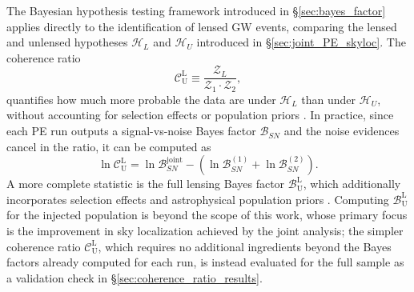 The Bayesian hypothesis testing framework introduced in 
\S\ref{sec:bayes_factor} applies directly to the 
identification of lensed GW events, comparing the lensed and unlensed hypotheses $\mathcal{H}_L$ and $\mathcal{H}_U$ introduced in \S\ref{sec:joint_PE_skyloc}. The coherence ratio
\begin{equation}
    \mathcal{C}_\mathrm{U}^\mathrm{L} \equiv 
    \frac{\mathcal{Z}_L}{\mathcal{Z}_1 \cdot \mathcal{Z}_2},
    \label{eq:coherence_ratio}
\end{equation}
quantifies how much more probable the data are under 
$\mathcal{H}_L$ than under $\mathcal{H}_U$, without 
accounting for selection effects or population priors 
\cite{lensing_regimes}. In practice, since each PE run outputs a signal-vs-noise Bayes factor $\mathcal{B}_{SN}$ and the noise evidences cancel in the ratio, it can be 
computed as
\begin{equation}
    \ln \mathcal{C}_\mathrm{U}^\mathrm{L} = 
    \ln \mathcal{B}_{SN}^\mathrm{joint} - 
    \left(\ln \mathcal{B}_{SN}^{(1)} + 
    \ln \mathcal{B}_{SN}^{(2)}\right).
    \label{eq:coherence_ratio_practical}
\end{equation}
A more complete statistic is the full lensing Bayes
factor $\mathcal{B}_\mathrm{U}^\mathrm{L}$, which
additionally incorporates selection effects and
astrophysical population priors \cite{PE_lensing_bayes}. Computing $\mathcal{B}_\mathrm{U}^\mathrm{L}$ for the injected
population is beyond the scope of this work, whose
primary focus is the improvement in sky localization
achieved by the joint analysis; the simpler coherence
ratio $\mathcal{C}_\mathrm{U}^\mathrm{L}$, which requires
no additional ingredients beyond the Bayes factors
already computed for each run, is instead evaluated for
the full sample as a validation check in
\S\ref{sec:coherence_ratio_results}.


